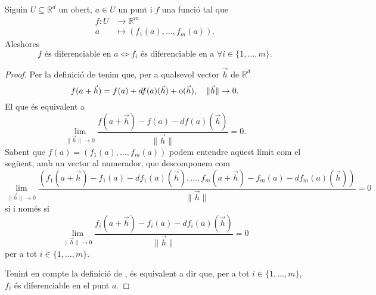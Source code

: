 \documentclass[../Apunts.tex]{subfiles}
\begin{document}
	\begin{proposition}
		\label{prop:diferenciable iff components diferenciables}
		Siguin \(U\subseteq\mathbb{R}^{d}\) un obert, \(a\in U\) un punt i \(f\) una funció tal que
		\begin{align*}
		f\colon U&\longrightarrow\mathbb{R}^{m}\\
		a&\longmapsto(f_{1}(a),\dots,f_{m}(a)).
		\end{align*}
		Aleshores
		\[f\text{ és diferenciable en }a\Leftrightarrow f_{i}\text{ és diferenciable en a }\forall i\in \{1,\dots,m\}.\]
		\begin{proof}
			Per la definició de  tenim que, per a qualsevol vector \(\vec{h}\) de \(\mathbb{R}^d\)
			\[f(a+\vec{h})=f(a)+df(a)(\vec{h})+\operatorname{o}(\vec{h}),\quad \lVert\vec{h}\rVert\to0.\]
			El que és equivalent a
			\[\lim_{\lVert\vec{h}\rVert\to0}\frac{f(a+\vec{h})-f(a)-df(a)(\vec{h})}{\lVert\vec{h}\rVert}=0.\]
			Sabent que \(f(a)=(f_{1}(a),\dots,f_{m}(a))\) podem entendre aquest límit com el següent, amb un vector al numerador, que descomponem com
			\[\lim_{\lVert\vec{h}\rVert\to0}\frac{(f_{1}(a+\vec{h})-f_{1}(a)-df_{1}(a)(\vec{h}),\dots,f_{m}(a+\vec{h})-f_{m}(a)-df_{m}(a)(\vec{h}))}{\lVert\vec{h}\rVert}=0\]
			si i només si%
			\[\lim_{\lVert\vec{h}\rVert\to0}\frac{f_{i}(a+\vec{h})-f_{i}(a)-df_{i}(a)(\vec{h})}{\lVert\vec{h}\rVert}=0\]
			per a tot \(i\in\{1,\dots,m\}\).
			
			Tenint en compte la definició de , és equivalent a dir que, per a tot \(i\in\{1,\dots,m\}\), \(f_{i}\) és diferenciable en el punt \(a\).
		\end{proof}
	\end{proposition}
\end{document}
